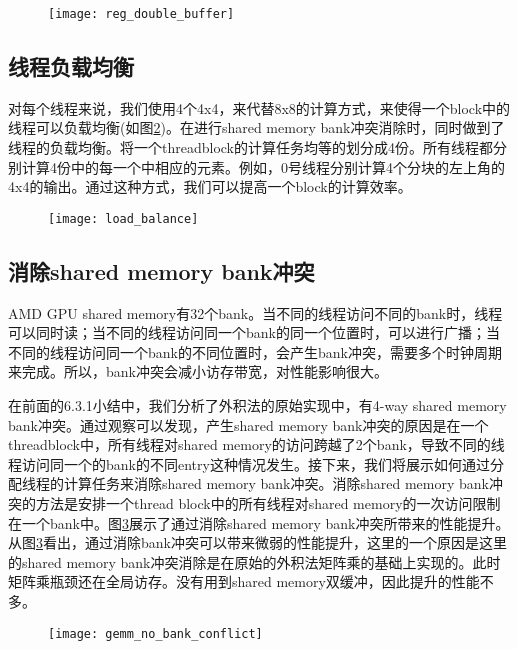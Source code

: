 \begin{figure}[htbp]
	\centering
	\texttt{[image: reg\_double\_buffer]}
	\label{fig:reg_double_buffer}
\end{figure}

\subsection{线程负载均衡}
对每个线程来说，我们使用4个4x4，来代替8x8的计算方式，来使得一个block中的线程可以负载均衡(如图\ref{fig:load_balance})。在进行shared memory bank冲突消除时，同时做到了线程的负载均衡。将一个threadblock的计算任务均等的划分成4份。所有线程都分别计算4份中的每一个中相应的元素。例如，0号线程分别计算4个分块的左上角的4x4的输出。通过这种方式，我们可以提高一个block的计算效率。
\begin{figure}[htbp]
	\centering
	\texttt{[image: load\_balance]}
	\label{fig:load_balance}
\end{figure}


\subsection{消除shared memory bank冲突}
AMD GPU shared memory有32个bank。当不同的线程访问不同的bank时，线程可以同时读；当不同的线程访问同一个bank的同一个位置时，可以进行广播；当不同的线程访问同一个bank的不同位置时，会产生bank冲突，需要多个时钟周期来完成。所以，bank冲突会减小访存带宽，对性能影响很大。

在前面的6.3.1小结中，我们分析了外积法的原始实现中，有4-way shared memory bank冲突。通过观察可以发现，产生shared memory bank冲突的原因是在一个threadblock中，所有线程对shared memory的访问跨越了2个bank，导致不同的线程访问同一个的bank的不同entry这种情况发生。接下来，我们将展示如何通过分配线程的计算任务来消除shared memory bank冲突。消除shared memory bank冲突的方法是安排一个thread block中的所有线程对shared memory的一次访问限制在一个bank中。图\ref{fig:gemm_no_bank_conflict}展示了通过消除shared memory bank冲突所带来的性能提升。从图\ref{fig:gemm_no_bank_conflict}看出，通过消除bank冲突可以带来微弱的性能提升，这里的一个原因是这里的shared memory bank冲突消除是在原始的外积法矩阵乘的基础上实现的。此时矩阵乘瓶颈还在全局访存。没有用到shared memory双缓冲，因此提升的性能不多。

\begin{figure}[htbp]
	\centering
	\texttt{[image: gemm\_no\_bank\_conflict]}
	\label{fig:gemm_no_bank_conflict}
\end{figure}


